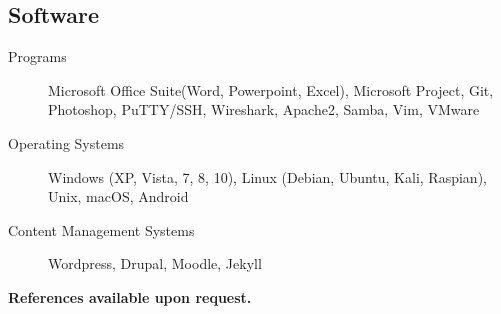 \documentclass{article}
\begin{document}
\begin{samepage}
\subsection{Software}

\begin{description}
\item[Programs] Microsoft Office Suite(Word, Powerpoint, Excel), Microsoft Project, Git, Photoshop, PuTTY/SSH, Wireshark, Apache2, Samba, Vim, VMware
\item[Operating Systems] Windows (XP, Vista, 7, 8, 10), Linux (Debian, Ubuntu, Kali, Raspian), Unix,  macOS, Android 
\item[Content Management Systems] Wordpress, Drupal, Moodle, Jekyll
\end{description}


\begin{center}
\textbf{References available upon request.}
\end{center}

\end{samepage}
\end{document}

